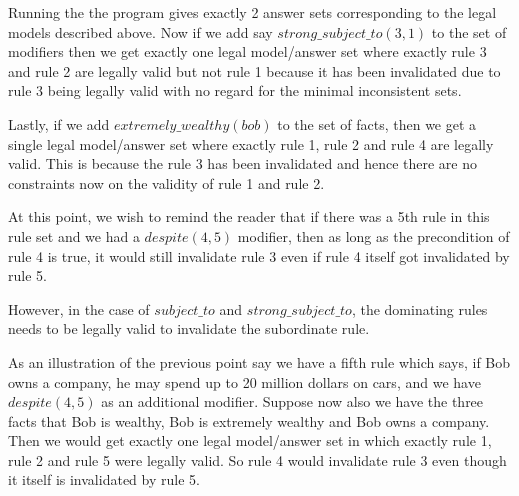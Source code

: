 Running the the program gives exactly 2 answer sets corresponding to the legal models described above. Now if we add say $strong\_subject\_to(3,1)$ to the set of modifiers then we get exactly one legal model/answer set where exactly rule 3 and rule 2 are legally valid but not rule 1 because it has been invalidated due to rule 3 being legally valid with no regard for the minimal inconsistent sets.

Lastly, if we add $extremely\_wealthy(bob)$ to the set of facts, then we get a single legal model/answer set where exactly rule 1, rule 2 and rule 4 are legally valid. This is because the rule 3 has been invalidated and hence there are no constraints now on the validity of rule 1 and rule 2.

At this point, we wish to remind the reader that if there was a 5th rule in this rule set and we had a $despite(4,5)$ modifier, then as long as the precondition of rule 4 is true, it would still invalidate rule 3 even if rule 4 itself got invalidated by rule 5.

However, in the case of $subject\_to$ and $strong\_subject\_to$, the dominating rules needs to be legally valid to invalidate the subordinate rule. 

As an illustration of the previous point say we have a fifth rule which says, if Bob owns a company, he may spend up to 20 million dollars on cars, and we have $despite(4,5)$ as an additional modifier. Suppose now also we have the three facts that Bob is wealthy, Bob is extremely wealthy and Bob owns a company. Then we would get exactly one legal model/answer set in which exactly rule 1, rule 2 and rule 5 were legally valid. So rule 4 would invalidate rule 3 even though it itself is invalidated by rule 5. 

